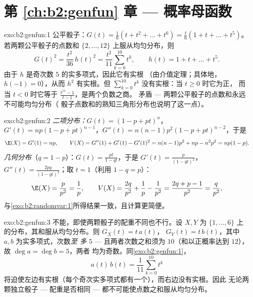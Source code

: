 \section*{第 \ref{ch:b2:genfun} 章 --- 概率母函数}

\begin{solution}{exo:b2:genfun:1}
公平骰子：$G(t) = \frac16(t + t^2 + \dots + t^6) = \frac t6(1 + t
+ \dots + t^5)$。若两颗公平骰子的点数和
$\{2, \dots, 12\}$ 上服从均匀分布，则
\[
G(t)^2 = \frac{t^2}{36}\,h(t)^2
= \frac{t^2}{11}\sum_{k=0}^{10}t^k ,
\qquad h(t) = 1 + t + \dots + t^5 .
\]
由于 $h$ 是奇次数 $5$ 的实多项式，因此它有实根
（由介值定理；具体地，$h(-1) = 0$），从而
$h^2$ 有实根。但 $\sum_{k=0}^{10}t^k$ 没有实根：当 $t \geq 0$ 时它为正，
而当 $t < 0$ 时它等于
$\frac{t^{11} - 1}{t - 1}$，是两个负数之商。
矛盾 --- 两颗公平骰子的点数和永远不可能均匀分布（
骰子点数和的熟知三角形分布也说明了这一点）。
\end{solution}

\begin{solution}{exo:b2:genfun:2}
\emph{二项分布：}$G(t) = (1 - p + pt)^n$，$G'(t) = np(1 - p +
pt)^{n-1}$，$G''(t) = n(n-1)p^2(1 - p + pt)^{n-2}$，于是
\[
\E(X) = G'(1) = np,
\qquad
V(X) = G''(1) + G'(1) - G'(1)^2
= n(n-1)p^2 + np - n^2p^2 = np(1-p).
\]
\emph{几何分布}（$q = 1 - p$）：$G(t) = \frac{pt}{1 - qt}$，于是
$G'(t) = \frac{p}{(1 - qt)^2}$，$G''(t) = \frac{2pq}{(1 -
qt)^3}$；取 $t = 1$（利用 $1 - q = p$）：
\[
\E(X) = \frac{p}{p^2} = \frac1p,
\qquad
V(X) = \frac{2q}{p^2} + \frac1p - \frac{1}{p^2}
= \frac{2q + p - 1}{p^2}
= \frac{q}{p^2} ,
\]
与\cref{exo:b2:randomvar:1}所得结果一致，且计算更简便。
\end{solution}

\begin{solution}{exo:b2:genfun:3}
不能，即使两颗骰子的配重不同也不行。设 $X, Y$ 为
$\{1, \dots, 6\}$ 上的分布，其和服从均匀分布。则 $G_X(t) = t\,a(t)$，
$G_Y(t) = t\,b(t)$，其中 $a, b$ 为实多项式，次数\emph{至
多} $5$ --- 且两者次数之和须为 $10$（和以正概率达到
$12$），故 $\deg a = \deg b = 5$，两者
均为奇数。同\cref{exo:b2:genfun:1}，
\[
a(t)\,b(t) = \frac{1}{11}\sum_{k=0}^{10}t^k
\]
将迫使左边有实根（每个奇次实多项式都有一个），而右边没有实根。因此
无论两颗独立骰子
--- 配重是否相同 --- 都不可能使点数之和服从均匀分布。
\end{solution}

